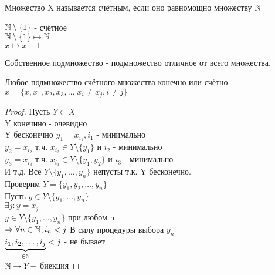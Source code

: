 \begin{definition}
	Множество X называется счётным, если оно равномощно множеству $ \mathbb{N} $
\end{definition}

\begin{example} $ $ \\
	$ \mathbb{N} \setminus \{1\} $ - счётное \\
	$ \mathbb{N} \setminus \{1\} \mapsto \mathbb{N} $\\
	$ x \mapsto x - 1 $ 
\end{example}

\begin{definition}
	Собственное подмножество - подмножество отличное от всего множества. 
\end{definition}

\begin{theorem}
	Любое подмножество счётного множества конечно или счётно \\
	$ x = \{ x, x_1, x_2, x_3, \dots | x_i \neq x_j, i \neq j \}$ \\
	\begin{proof}
		Пусть $ Y \subset X $ \\
		Y конечнно - очевидно \\
		Y бесконечно $ y_1 = x_{i_1}, i_1 $ - минимально \\
		$ y_2 = x_{i_2} $ т.ч. $ x_{i_2} \in Y \setminus \{y_1\} $ и $ i_2 $ - минимально\\
		$ y_3 = x_{i_3} $ т.ч. $ x_{i_3} \in Y \setminus \{y_1, y_2\} $ и $ i_3 $ - минимально\\
		И т.д. Все $ Y \setminus \{y_1, \dots, y_n \} $ непусты т.к. Y бесконечно. \\
		Проверим $ Y = \{y_1, y_2, \dots, y_n \} $ \\
		Пусть $ y \in Y \setminus \{ y_1, \dots, y_n \} $ \\
		$ \exists j : y = x_j $ \\
		$ y \in Y \setminus \{ y_1, \dots, y_n \} $ при любом n \\
		$ \Rightarrow \forall n \in \mathbb{N}, i_n < j $ В силу процедуры выбора $ y_n $ \\
		$\underbrace{i_1, i_2, \dots, i_j}_{\in \mathbb{N}} < j $ - не бывает \\
		$ \mathbb{N} \rightarrow Y - $ биекция
	\end{proof}
\end{theorem}


